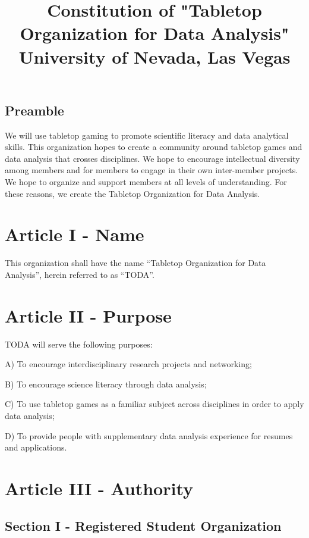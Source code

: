 \documentclass[11pt]{article}
\date{}
\title{Constitution of "Tabletop Organization for Data Analysis"\\\medskip
\large University of Nevada, Las Vegas}
\begin{document}
\maketitle
\tableofcontents

\subsection{Preamble}
\label{sec:org1ab1744}
We will use tabletop gaming to promote scientific literacy and data analytical skills. 
This organization hopes to create a community around tabletop games and data analysis that crosses disciplines. 
We hope to encourage intellectual diversity among members and for members to engage in their own inter-member projects. 
We hope to organize and support members at all levels of understanding. 
For these reasons, we create the Tabletop Organization for Data Analysis.

\section{Article I - Name}
\label{sec:org4c3f992}

This organization shall have the name “Tabletop Organization for Data Analysis”, herein referred to as “TODA”.
\section{Article II - Purpose}
\label{sec:org4f964a3}

TODA will serve the following purposes:

A) To encourage interdisciplinary research projects and networking;

B) To encourage science literacy through data analysis;

C) To use tabletop games as a familiar subject across disciplines in order to apply data analysis;

D) To provide people with supplementary data analysis experience for resumes and applications.

\section{Article III - Authority}
\label{sec:org4c0ca29}

\subsection{Section I - Registered Student Organization}
\label{sec:orgadad932}
\end{document}
